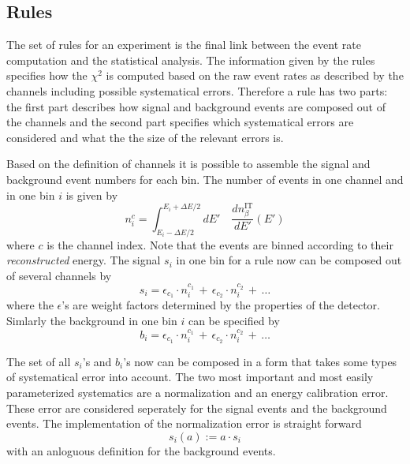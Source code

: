\subsection{Rules}
\label{sec:rules}

The set of rules for an experiment is the final 
link between the event rate
computation and the statistical analysis. The information given by the rules
specifies how the $\chi^2$ is computed based on the raw event rates as 
described by the channels including possible systematical errors. 
Therefore a rule has two parts: the first part describes how signal and 
background events are composed out of the channels and the second part
specifies which systematical errors are considered and what the the size
of the relevant errors is.

Based on the definition of channels it is possible to assemble the 
signal and background event numbers for each bin.  
The number of events in one channel and  in one bin $i$ is given by
\begin{equation}
n_i^c=\int_{E_i-\Delta E/2}^{E_i+\Delta E/2} dE' \quad
\frac{dn_{\beta}^{\text{IT}}}{dE'} (E')
\end{equation}
where $c$ is the channel index.
Note that the events are binned according to their \emph{reconstructed} energy.
The signal $s_i$ in one bin for a rule now can be composed out of 
several channels by
\begin{equation}
s_i=\epsilon_{c_1}\cdot n_i^{c_1}\,+\,\epsilon_{c_2}\cdot n_i^{c_2}\,+\,\ldots
\end{equation}
where the $\epsilon$'s are weight factors determined by the properties
of the detector.
Simlarly the background in one bin $i$ can be specified by
\begin{equation}
b_i=\epsilon_{c_1}\cdot n_i^{c_1}\,+\,\epsilon_{c_2}\cdot n_i^{c_2}\,+\,\ldots
\end{equation}


The set of all $s_i$'s and $b_i$'s now can be composed in a form that takes
some types of systematical error into account. The two most important and
most easily parameterized systematics are a normalization and an energy
calibration error. These error are considered seperately for the signal events
and the background events. The implementation of the normalization error
is straight forward
\begin{equation}
s_i(a):=a\cdot s_i
\end{equation} 
with an anloguous definition for the background events.

